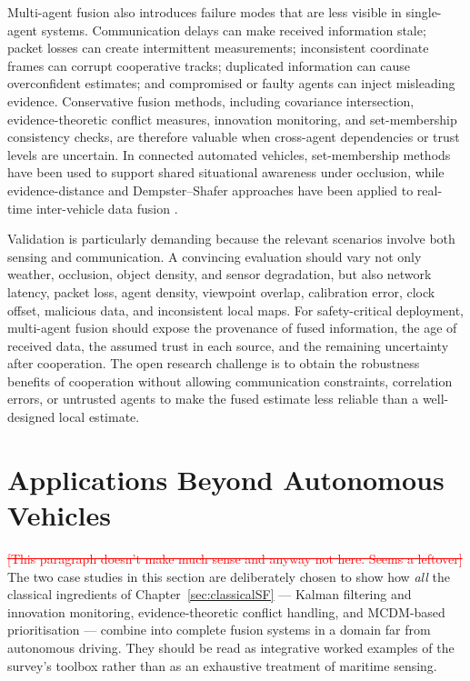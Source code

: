 \documentclass[11pt,oneside,openany]{book}
\newcommand{\added}[1]{\textcolor{RevisionBlue}{#1}}
\newcommand{\deleted}[1]{\textcolor{red}{\sout{#1}}}
\begin{document}
Multi-agent fusion also introduces failure modes that are less visible in single-agent systems. Communication delays can make received information stale; packet losses can create intermittent measurements; inconsistent coordinate frames can corrupt cooperative tracks; duplicated information can cause overconfident estimates; and compromised or faulty agents can inject misleading evidence. Conservative fusion methods, including covariance intersection, evidence-theoretic conflict measures, innovation monitoring, and set-membership consistency checks, are therefore valuable when cross-agent dependencies or trust levels are uncertain. In connected automated vehicles, set-membership methods have been used to support shared situational awareness under occlusion, while evidence-distance and Dempster--Shafer approaches have been applied to real-time inter-vehicle data fusion \cite{narri2021_set_membership_shared_awareness,cho_realtime_2020}.

Validation is particularly demanding because the relevant scenarios involve both sensing and communication. A convincing evaluation should vary not only weather, occlusion, object density, and sensor degradation, but also network latency, packet loss, agent density, viewpoint overlap, calibration error, clock offset, malicious data, and inconsistent local maps. For safety-critical deployment, multi-agent fusion should expose the provenance of fused information, the age of received data, the assumed trust in each source, and the remaining uncertainty after cooperation. The open research challenge is to obtain the robustness benefits of cooperation without allowing communication constraints, correlation errors, or untrusted agents to make the fused estimate less reliable than a well-designed local estimate.

\chapter{Applications Beyond Autonomous Vehicles}
\label{sec:applications}
\deleted{[This paragraph doesn't make much sense and anyway not here. Seems a leftover]} %
\added{The two case studies in this section are deliberately chosen to show how \emph{all} the classical ingredients of Chapter~\ref{sec:classicalSF} --- Kalman filtering and innovation monitoring, evidence-theoretic conflict handling, and MCDM-based prioritisation --- combine into complete fusion systems in a domain far from autonomous driving. They should be read as integrative worked examples of the survey's toolbox rather than as an exhaustive treatment of maritime sensing.}
\end{document}

